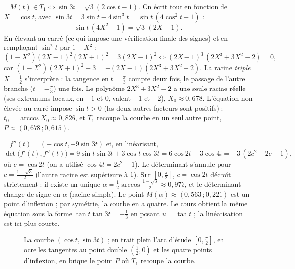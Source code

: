 \documentclass[a4paper,11pt]{article}
\numberwithin{equation}{section}
\numberwithin{figure}{section}
\numberwithin{table}{section}
\theoremstyle{enonce}
\theoremstyle{exemple}
\theoremstyle{remarque}
\newcommand{\etape}[1]{\par\smallskip\noindent{\sffamily\bfseries\small\color{BleuMoyen}#1.}\ }
\begin{document}
\etape{Intersection de $T_1$ et de la courbe} $M(t)\in T_1\iff\sin3t=\sqrt3(2\cos t-1)$. On écrit tout en fonction de
$X=\cos t$, avec $\sin3t=3\sin t-4\sin^3t=\sin t\,(4\cos^2t-1)$ :
\[\sin t\,(4X^2-1)=\sqrt3\,(2X-1).\]
En élevant au carré (ce qui impose une vérification finale des signes) et en remplaçant $\sin^2t$ par $1-X^2$ :
\[(1-X^2)(2X-1)^2(2X+1)^2=3(2X-1)^2\iff(2X-1)^3\,(2X^3+3X^2-2)=0,\]
car $(1-X^2)(2X+1)^2-3=-(2X-1)(2X^3+3X^2-2)$. La racine \emph{triple} $X=\frac12$ s'interprète : la tangence en
$t=\frac\pi3$ compte deux fois, le passage de l'autre branche ($t=-\frac\pi3$) une fois. Le polynôme $2X^3+3X^2-2$ a une
seule racine réelle (ses extremums locaux, en $-1$ et $0$, valent $-1$ et $-2$), $X_0\approx0{,}678$. L'équation non
élevée au carré impose $\sin t>0$ (les deux autres facteurs sont positifs) : $t_0=\arccos X_0\approx0{,}826$, et $T_1$
recoupe la courbe en un seul autre point, $P\approx(0{,}678\,;0{,}615)$.

\etape{Inflexions} $f''(t)=(-\cos t,-9\sin3t)$ et, en linéarisant,
\[\det\big(f'(t),f''(t)\big)=9\sin t\sin3t+3\cos t\cos3t=6\cos2t-3\cos4t=-3\,(2c^2-2c-1),\]
où $c=\cos2t$ (on a utilisé $\cos4t=2c^2-1$).
Le déterminant s'annule pour $c=\frac{1-\sqrt3}2$ (l'autre racine est supérieure à $1$). Sur $\left[0,\frac\pi2\right]$,
$c=\cos2t$ décroît strictement : il existe un unique $\alpha=\frac12\arccos\frac{1-\sqrt3}2\approx0{,}973$, et le
déterminant change de signe en $\alpha$ (racine simple). Le point $M(\alpha)\approx(0{,}563\,;0{,}221)$ est un point
d'inflexion ; par symétrie, la courbe en a quatre. Le cours obtient la même équation sous la forme
$\tan t\tan3t=-\frac13$ en posant $u=\tan t$ ; la linéarisation est ici plus courte.

\begin{figure}[H]
\centering
{}
\caption{La courbe $(\cos t,\sin3t)$ ; en trait plein l'arc d'étude $\left[0,\frac\pi2\right]$, en ocre les tangentes au
point double $\left(\frac12,0\right)$ et les quatre points d'inflexion, en brique le point $P$ où $T_1$ recoupe la courbe.}
\end{figure}
\end{document}
